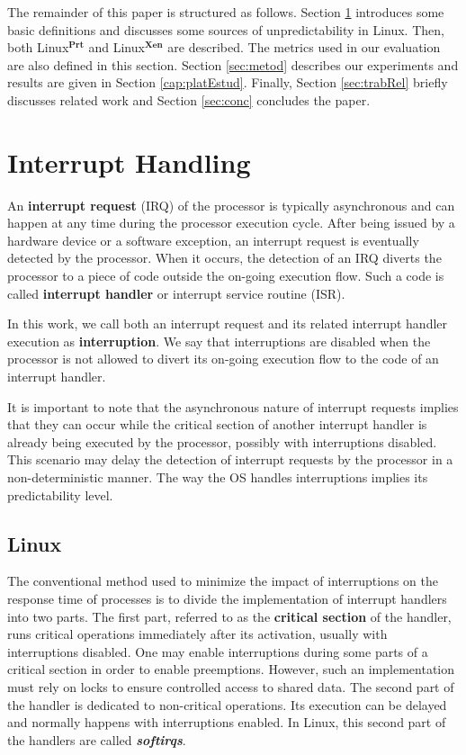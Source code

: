 \documentclass{acm_proc_article-sp}
\begin{document}
The remainder of this paper is structured as follows. Section \ref{sec:irqHand}
introduces some basic definitions and discusses some sources of unpredictability in
Linux. Then, both Linux$^{\mathbf{Prt}}$ and Linux$^{\mathbf{Xen}}$ are described.
The metrics used in our evaluation are also defined in this section. Section
\ref{sec:metod} describes our experiments and results are given in Section
\ref{cap:platEstud}. Finally, Section \ref{sec:trabRel} briefly discusses related
work and Section \ref{sec:conc} concludes the paper. 

\section{Interrupt Handling}
\label{sec:irqHand}

An \textbf{interrupt request} (IRQ) of the processor is typically asynchronous and
can happen at any time during the processor execution cycle. After being issued by a
hardware device or a software exception, an interrupt request is eventually detected
by the processor. When it occurs, the detection of an IRQ diverts the processor to a piece
of code outside the on-going execution flow. Such a code is called \textbf{interrupt
  handler} or interrupt service routine (ISR).

In this work, we call both an interrupt request and its related interrupt handler
execution as \textbf{interruption}. We say that interruptions are disabled when
the processor is not allowed to divert its on-going execution flow to the code of an
interrupt handler.

It is important to note that the asynchronous nature of interrupt requests implies
that they can occur while the critical section of another interrupt handler is
already being executed by the processor, possibly with interruptions disabled. This
scenario may delay the detection of interrupt requests by the processor in a
non-deterministic manner. The way the OS handles interruptions implies its
predictability level.


\subsection{Linux}
\label{sec:linuxStd}

The conventional method used to minimize the impact of interruptions on the response
time of processes is to divide the implementation of interrupt handlers into two
parts. The first part, referred to as the \textbf{critical section} of the handler,
runs critical operations immediately after its activation, usually with
interruptions disabled.  One may enable interruptions during some parts of a
critical section in order to enable preemptions. However, such an implementation
must rely on locks to ensure controlled access to shared data. The second part of
the handler is dedicated to non-critical operations. Its execution can be delayed
and normally happens with interruptions enabled.  In Linux, this second part of the
handlers are called \textbf{\emph{softirqs}}.
\end{document}
